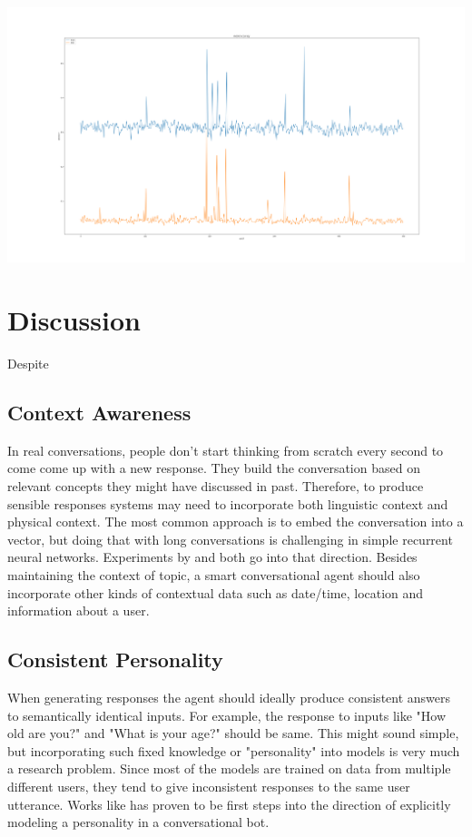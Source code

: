 \documentclass[letterpaper] {article} %
\begin{document}
\begin{center}
	\includegraphics[width=\linewidth]{figures/accuracy.png}
\end{center}
\section{Discussion}
Despite 
\subsection{Context Awareness}
In real conversations, people don't start thinking from scratch every second to come come up with a new response. They build the conversation based on relevant concepts they might have discussed in past. Therefore, to produce sensible responses systems may need to incorporate both linguistic context and physical context. The most common approach is to embed the conversation into a vector, but doing that with long conversations is challenging in simple recurrent neural networks. Experiments by \cite{serban2016building} and \cite{yao2015attention} both go into that direction. Besides maintaining the context of topic, a smart conversational agent should also incorporate other kinds of contextual data such as date/time, location and information about a user.

\subsection{Consistent Personality}
When generating responses the agent should ideally produce consistent answers to semantically identical inputs. For example, the response to inputs like "How old are you?" and "What is your age?" should be same. This might sound simple, but incorporating such fixed knowledge or "personality" into models is very much a research problem. Since most of the models are trained on data from multiple different users, they tend to give inconsistent responses to the same user utterance. Works like \cite{li2016persona} has proven to be first steps into the direction of explicitly modeling a personality in a conversational bot.
\end{document}
